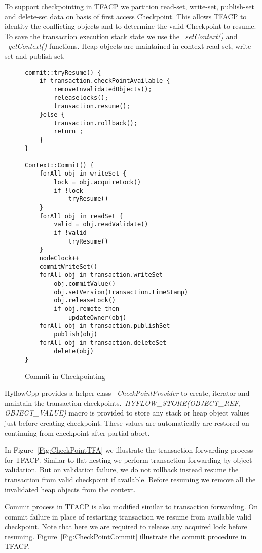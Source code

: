 \documentclass[12pt,english]{report}
\begin{document}
To support checkpointing in TFACP we partition read-set, write-set, publish-set and delete-set data on basis of first access Checkpoint. This allows TFACP to identity the conflicting objects and to determine the valid Checkpoint to resume. To save the transaction execution stack state we use the ~\emph{setContext()} and ~\emph{getContext()} functions. Heap objects are maintained in context read-set, write-set and publish-set. 

\begin{figure}
\begin{minipage}[b]{0.9\linewidth}\centering
\begin{lstlisting}
commit::tryResume() {
	if transaction.checkPointAvailable {
		removeInvalidatedObjects();
		releaselocks();
		transaction.resume();
	}else {
		transaction.rollback();
		return ;
	}		
}

Context::Commit() {
	forAll obj in writeSet {
		lock = obj.acquireLock()
		if !lock
			tryResume()
	}
	forAll obj in readSet {
		valid = obj.readValidate()
		if !valid
			tryResume()
	}
	nodeClock++
	commitWriteSet()
	forAll obj in transaction.writeSet
		obj.commitValue()
 		obj.setVersion(transaction.timeStamp)
 		obj.releaseLock()
 		if obj.remote then
 			updateOwner(obj)
	forAll obj in transaction.publishSet
		publish(obj)
	forAll obj in transaction.deleteSet
		delete(obj)
}
\end{lstlisting}
\end{minipage}
\caption{Commit in Checkpointing}
\label{Fig:CheckpointCommit}
\end{figure}

HyflowCpp provides a helper class ~\emph{CheckPointProvider} to create, iterator and maintain the transaction checkpoints.~\emph{HYFLOW{\_}STORE(OBJECT{\_}REF, OBJECT{\_}VALUE)} macro is provided to store any stack or heap object values just before creating checkpoint. These values are automatically are restored on continuing from checkpoint after partial abort.     

In Figure~\ref{Fig:CheckPointTFA} we illustrate the transaction forwarding process for TFACP. Similar to flat nesting we perform transaction forwarding by object validation. But on validation failure, we do not rollback instead resume the transaction from valid checkpoint if available. Before resuming we remove all the invalidated heap objects from the context.

Commit process in TFACP is also modified similar to transaction forwarding. On commit failure in place of restarting transaction we resume from available valid checkpoint. Note that here we are required to release any acquired lock before resuming. Figure~\ref{Fig:CheckPointCommit} illustrate the commit procedure in TFACP. 
\end{document}
